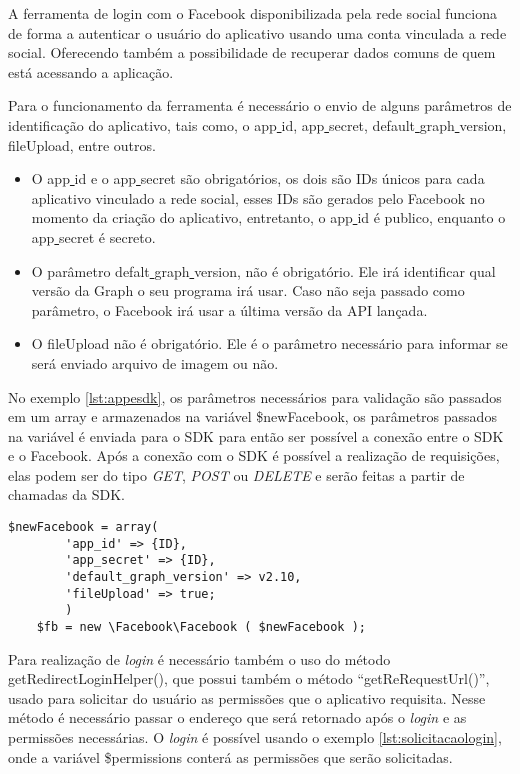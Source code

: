 A ferramenta de login com o Facebook disponibilizada pela rede social funciona de forma a autenticar o usuário do aplicativo usando uma conta vinculada a rede social. Oferecendo também a possibilidade de recuperar dados comuns de quem está acessando a aplicação.

Para o funcionamento da ferramenta é necessário o envio de alguns parâmetros de identificação do aplicativo, tais como, o app\underline{{ }}id, app\underline{{ }}secret, default\underline{{ }}graph\underline{{ }}version, fileUpload, entre outros.

\begin{itemize}
\item O app\underline{{ }}id e o app\underline{{ }}secret são obrigatórios, os dois são IDs únicos para cada aplicativo vinculado a rede social, esses IDs são gerados pelo Facebook no momento da criação do aplicativo, entretanto, o app\underline{{ }}id é publico, enquanto o app\underline{{ }}secret é secreto.

\item O parâmetro defalt\underline{{ }}graph\underline{{ }}version, não é obrigatório. Ele irá identificar qual versão da Graph o seu programa irá usar. Caso não seja passado como parâmetro, o Facebook irá usar a última versão da API lançada.

\item O fileUpload não é obrigatório. Ele é o parâmetro necessário para informar se será enviado arquivo de imagem ou não.
\end{itemize}

No exemplo \ref{lst:appesdk}, os parâmetros necessários para validação são passados em um array e armazenados na variável \$newFacebook, os parâmetros passados na variável é enviada para o SDK para então ser possível a conexão entre o SDK e o Facebook. Após a conexão com o SDK é possível a realização de requisições, elas podem ser do tipo \textit{GET}, \textit{POST} ou \textit{DELETE} e serão feitas a partir de chamadas da SDK.

\begin{lstlisting}[caption={Conexão entre aplicativo e SDK},label={lst:appesdk}]
	$newFacebook = array(
		'app_id' => {ID},
		'app_secret' => {ID},
		'default_graph_version' => v2.10,
		'fileUpload' => true;
		)
	$fb = new \Facebook\Facebook ( $newFacebook );
\end{lstlisting}

Para realização de \textit{login} é necessário também o uso do método getRedirectLoginHelper(), que possui também o método ``getReRequestUrl()'', usado para solicitar do usuário as permissões que o aplicativo requisita. Nesse método é necessário passar o endereço que será retornado após o \textit{login} e as permissões necessárias. O \textit{login} é possível usando o exemplo \ref{lst:solicitacaologin}, onde a variável \$permissions conterá as permissões que serão solicitadas.

